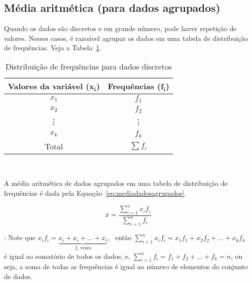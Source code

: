 \documentclass[11pt,fleqn]{book} %
\begin{document}
\subsection{Média aritmética (para dados agrupados)}

Quando os dados são discretos e em grande número, pode haver repetição de valores. Nesses casos, é razoável agrupar os dados em uma tabela de distribuição de frequências. Veja a Tabela~\ref{tab:distfreqdisc}. 

\begin{table}[H]
	\caption{Distribuição de frequências para dados discretos}
	\label{tab:distfreqdisc} 
	\vspace{-0.1cm}
	\centering
	\begin{tabular}{c c}
	\toprule
	\textbf{Valores da variável ($\bm{x_i}$)} & \textbf{Frequências ($\bm{f_i}$)}\\
	\midrule
	$x_1$ & $f_1$ \\
	$x_2$ & $f_2$ \\
	\vdots & \vdots \\
	$x_k$ & $f_k$ \\
	\midrule
	Total & $\sum{f_i}$ \\
	\bottomrule
	\end{tabular} \\
\end{table}


A média aritmética de dados agrupados em uma tabela de distribuição de frequências é dada pela Equação~\ref{eq:mediadadosagrupados}.

\begin{eBox}
\vspace{-0.5cm}
\begin{equation} \label{eq:mediadadosagrupados}
	\bar{x}=\frac{\displaystyle \sum_{i=1}^{n}{x_i f_i}}{\displaystyle \sum_{i=1}^{n}{f_i}}
\end{equation}
\end{eBox}

\vspace{0.3cm}

: Note que $x_i f_i=\underbrace{x_i+x_i+...+x_i}_{f_i \, \, \mbox{vezes}}$, \, então $\displaystyle \sum_{i=1}^{n}{x_i f_i}=x_1 f_1+x_2 f_2+...+x_k f_k$ \, é igual ao somatório de todos os dados, e, $\displaystyle \sum_{i=1}^{n}{f_i}=f_1+f_2+...+f_k=n$, ou seja, a soma de todas as frequências é igual ao número de elementos do conjunto de dados. \\
\end{document}
